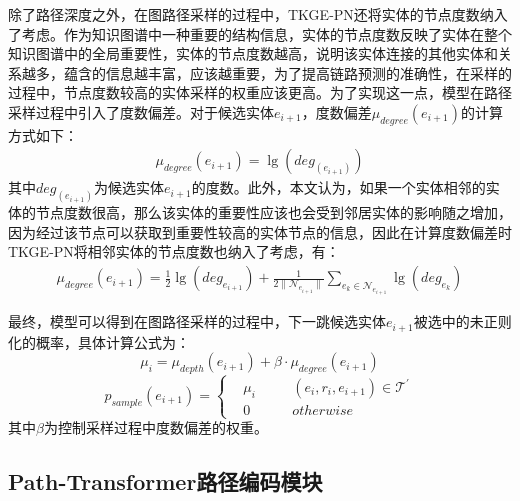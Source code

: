 除了路径深度之外，在图路径采样的过程中，TKGE-PN还将实体的节点度数纳入了考虑。作为知识图谱中一种重要的结构信息，实体的节点度数反映了实体在整个知识图谱中的全局重要性，实体的节点度数越高，说明该实体连接的其他实体和关系越多，蕴含的信息越丰富，应该越重要，为了提高链路预测的准确性，在采样的过程中，节点度数较高的实体采样的权重应该更高。为了实现这一点，模型在路径采样过程中引入了度数偏差。对于候选实体$e_{i+1}$，度数偏差$\mu_{degree}(e_{i+1})$的计算方式如下：
\begin{gather}
  \mu_{degree}(e_{i+1})=\lg(deg_{(e_{i+1})})
\end{gather}
其中$deg_{(e_{i+1})}$为候选实体$e_{i+1}$的度数。此外，本文认为，如果一个实体相邻的实体的节点度数很高，那么该实体的重要性应该也会受到邻居实体的影响随之增加，因为经过该节点可以获取到重要性较高的实体节点的信息，因此在计算度数偏差时TKGE-PN将相邻实体的节点度数也纳入了考虑，有：
\begin{gather}
  \mu_{degree}(e_{i+1})=\frac{1}{2}\lg(deg_{e_{i+1}})+\frac{1}{2\|\mathcal{N}_{e_{i+1}}\|}\sum_{e_k\in\mathcal{N}_{e_{i+1}}}\lg(deg_{e_k})
\end{gather}

最终，模型可以得到在图路径采样的过程中，下一跳候选实体$e_{i+1}$被选中的未正则化的概率，具体计算公式为：
\begin{equation}
  \mu_i = \mu_{depth}(e_{i+1})+\beta\cdot\mu_{degree}(e_{i+1})
\end{equation}
\begin{equation}
  p_{sample}(e_{i+1})=\left\{
      \begin{aligned}
          &\mu_i &&\quad (e_i,r_i,e_{i+1})\in \mathcal{T}^{\prime} \\
          &0 &&\quad otherwise
      \end{aligned}
  \right.
\end{equation}
其中$\beta$为控制采样过程中度数偏差的权重。

\subsection{Path-Transformer路径编码模块}

